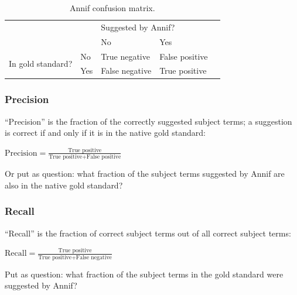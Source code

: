 \begin{table}[h]
\centering
\begin{tabular}{lllll}
 &                       & \multicolumn{2}{l}{Suggested by Annif?}            &  \\ \cline{3-4}
 & \multicolumn{1}{l|}{} & \multicolumn{1}{l|}{No} & \multicolumn{1}{l|}{Yes} &  \\ \cline{2-4}
\multicolumn{1}{l|}{\multirow{2}{*}{In gold standard?}} & \multicolumn{1}{l|}{No}  & \multicolumn{1}{l|}{True negative}  & \multicolumn{1}{l|}{False positive} &  \\ \cline{2-4}
\multicolumn{1}{l|}{}                                   & \multicolumn{1}{l|}{Yes} & \multicolumn{1}{l|}{False negative} & \multicolumn{1}{l|}{True positive}  &  \\ \cline{2-4}
\end{tabular}
\caption{Annif confusion matrix.}
\label{tab:confusion-matrix}
\end{table}

\hypertarget{precision}{%
\subsubsection{Precision}\label{precision}}

``Precision'' is the fraction of the correctly suggested subject terms;
a suggestion is correct if and only if it is in the native gold
standard:

\begin{center} 
$\text{Precision} = \displaystyle \frac{\text{True positive}}{\text{True positive} + \text{False positive}}$
\end{center}

Or put as question: what fraction of the subject terms suggested by
Annif are also in the native gold standard?

\hypertarget{recall}{%
\subsubsection{Recall}\label{recall}}

``Recall'' is the fraction of correct subject terms out of all correct
subject terms:

\begin{center} 
$\text{Recall} = \displaystyle \frac{\text{True positive}}{\text{True positive} + \text{False negative}}$
\end{center}

Put as question: what fraction of the subject terms in the gold standard
were suggested by Annif?

